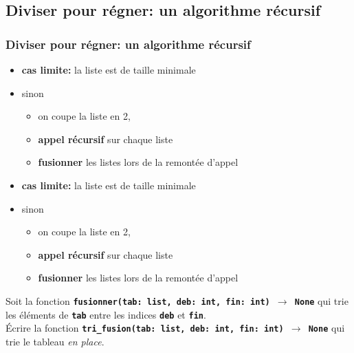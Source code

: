 \documentclass[svgnames,11pt]{beamer}
\begin{document}
\subsection{Diviser pour régner: un algorithme récursif}
\begin{frame}
    \frametitle{Diviser pour régner: un algorithme récursif}
    \begin{center}
        \begin{itemize}
            \item \textbf{cas limite:} la liste est de taille minimale
            \item sinon
                  \begin{itemize}
                      \item on coupe la liste en 2,
                      \item \textbf{appel récursif} sur chaque liste
                      \item \textbf{fusionner} les listes lors de la remontée d'appel
                  \end{itemize}
        \end{itemize}
    \end{center}
\end{frame}
\begin{frame}
    \begin{center}
        \begin{itemize}
            \item \textbf{cas limite:} la liste est de taille minimale
            \item sinon
                  \begin{itemize}
                      \item on coupe la liste en 2,
                      \item \textbf{appel récursif} sur chaque liste
                      \item \textbf{fusionner} les listes lors de la remontée d'appel
                  \end{itemize}
        \end{itemize}
    \end{center}
    \begin{activite}
        Soit la fonction \textbf{\texttt{fusionner(tab: list, deb: int, fin: int) $\rightarrow$ None}} qui trie les éléments de \textbf{\texttt{tab}} entre les indices \textbf{\texttt{deb}} et \textbf{\texttt{fin}}.\\ Écrire la fonction \textbf{\texttt{tri\_fusion(tab: list, deb: int, fin: int) $\rightarrow$ None}} qui trie le tableau \emph{en place}.
    \end{activite}

\end{frame}
\end{document}
